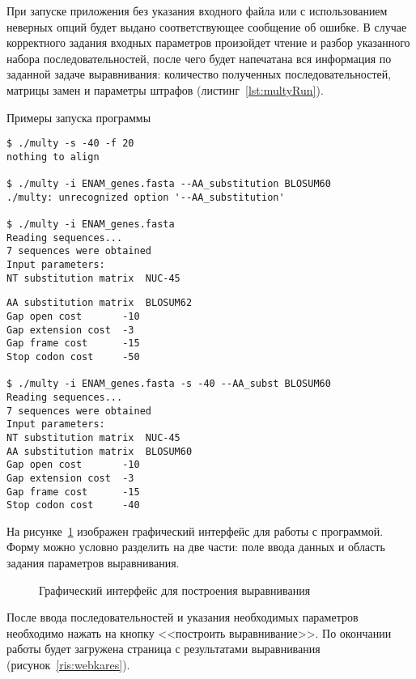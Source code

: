 При запуске приложения без указания входного файла или с использованием неверных опций будет выдано соответствующее сообщение об ошибке. В случае корректного задания входных параметров произойдет чтение и разбор указанного набора последовательностей, после чего будет напечатана вся информация по заданной задаче выравнивания: количество полученных последовательностей, матрицы замен и параметры штрафов (листинг~\ref{lst:multyRun}).

\begin{algorithm}[H]
	\caption{Примеры запуска программы} \label{lst:multyRun}
	\begin{lstlisting}
$ ./multy -s -40 -f 20
nothing to align

$ ./multy -i ENAM_genes.fasta --AA_substitution BLOSUM60
./multy: unrecognized option '--AA_substitution'

$ ./multy -i ENAM_genes.fasta 
Reading sequences...
7 sequences were obtained
Input parameters:
NT substitution matrix	NUC-45
	\end{lstlisting}
\end{algorithm}

\begin{algorithm}
	\begin{lstlisting}
AA substitution matrix	BLOSUM62
Gap open cost		-10
Gap extension cost	-3
Gap frame cost		-15
Stop codon cost		-50

$ ./multy -i ENAM_genes.fasta -s -40 --AA_subst BLOSUM60
Reading sequences...
7 sequences were obtained
Input parameters:
NT substitution matrix	NUC-45
AA substitution matrix	BLOSUM60
Gap open cost		-10
Gap extension cost	-3
Gap frame cost		-15
Stop codon cost		-40
	\end{lstlisting}
\end{algorithm}

На рисунке~\ref{ris:webka} изображен графический интерфейс для работы с программой. Форму можно условно разделить на две части: поле ввода данных и область задания параметров выравнивания. 

\begin{figure}[H]
	\caption{Графический интерфейс для построения выравнивания}
	\label{ris:webka}
\end{figure}

После ввода последовательностей и указания необходимых параметров необходимо нажать на кнопку <<построить выравнивание>>. По окончании работы будет загружена страница с результатами выравнивания (рисунок~\ref{ris:webkares}).

